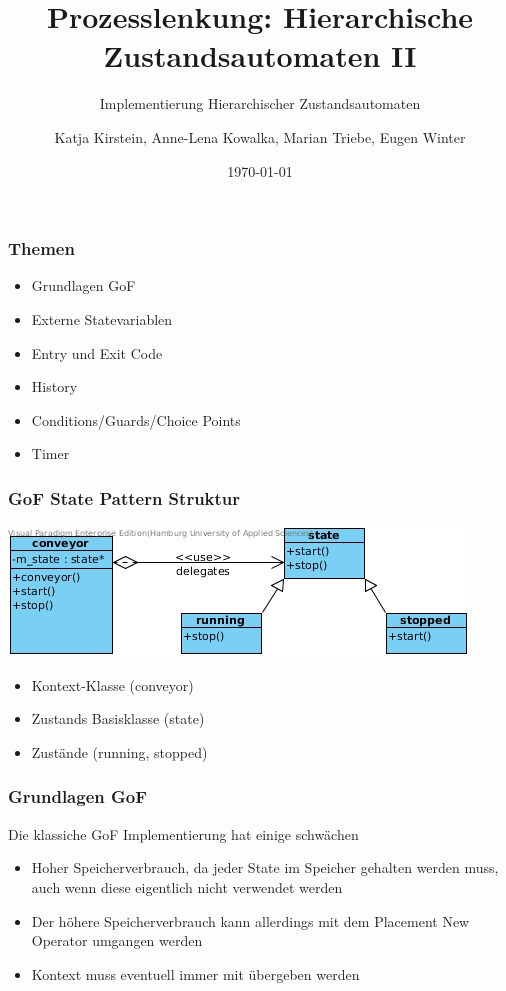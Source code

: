 \documentclass{beamer}
\title{Prozesslenkung: Hierarchische Zustandsautomaten II}
\subtitle{Implementierung Hierarchischer Zustandsautomaten}
\author{Katja Kirstein, Anne-Lena Kowalka, Marian Triebe, Eugen Winter}
\date{\today}
\begin{document}
\begin{frame}
\titlepage
\end{frame}

\begin{frame}
 \frametitle{Themen}
 \begin{itemize}
  \item Grundlagen GoF
  \item Externe Statevariablen
  \item Entry und Exit Code
  \item History
  \item Conditions/Guards/Choice Points
  \item Timer
 \end{itemize}
\end{frame}

\begin{frame}
 \frametitle{GoF State Pattern Struktur}
 \includegraphics[scale=.6]{img/fsm_gof.jpg}
 \begin{itemize}
  \item Kontext-Klasse (conveyor)
  \item Zustands Basisklasse (state)
  \item Zust\"ande (running, stopped)
 \end{itemize}
\end{frame}

\begin{frame}
 \frametitle{Grundlagen GoF}
 Die klassiche GoF Implementierung hat einige schw\"achen
 \begin{itemize}
  \item Hoher Speicherverbrauch, da jeder State im Speicher gehalten werden muss, auch wenn diese eigentlich nicht verwendet werden
  \item Der h\"ohere Speicherverbrauch kann allerdings mit dem Placement New Operator umgangen werden
  \item Kontext muss eventuell immer mit \"ubergeben werden
 \end{itemize}
\end{frame}
\end{document}
